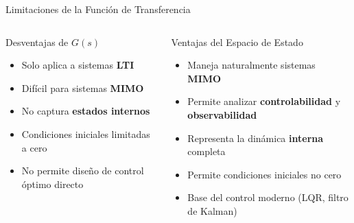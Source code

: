 \documentclass[aspectratio=169,xcolor=dvipsnames]{beamer}
\begin{document}
\begin{frame}{Limitaciones de la Funci\'on de Transferencia}
    \begin{columns}
        \begin{alertblock}{Desventajas de $G(s)$}
            \begin{itemize}
                \item Solo aplica a sistemas \textbf{LTI}
                \item Dif\'icil para sistemas \textbf{MIMO}
                \item No captura \textbf{estados internos}
                \item Condiciones iniciales limitadas a cero
                \item No permite dise\~no de control \'optimo directo
            \end{itemize}
        \end{alertblock}
        \begin{block}{Ventajas del Espacio de Estado}
            \begin{itemize}
                \item Maneja naturalmente sistemas \textbf{MIMO}
                \item Permite analizar \textbf{controlabilidad} y \textbf{observabilidad}
                \item Representa la din\'amica \textbf{interna} completa
                \item Permite condiciones iniciales no cero
                \item Base del control moderno (LQR, filtro de Kalman)
            \end{itemize}
        \end{block}
    \end{columns}
\end{frame}
\end{document}

